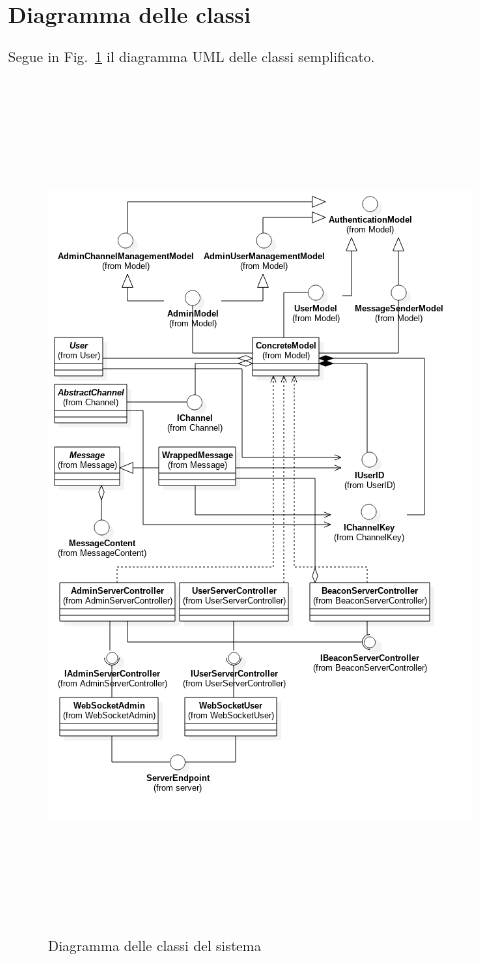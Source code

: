 	\subsection{Diagramma delle classi}
	Segue in Fig.~\ref{diagrammaclassi} il diagramma \gls{UML} delle classi semplificato.

	\begin{figure}[H]
		\begin{center}
			\includegraphics[width=16.5cm,height=22.5cm,keepaspectratio]{UML/png/Design Model__SimpleClasses_6}
			\caption{Diagramma delle classi del sistema}\label{diagrammaclassi}
		\end{center}
	\end{figure}

